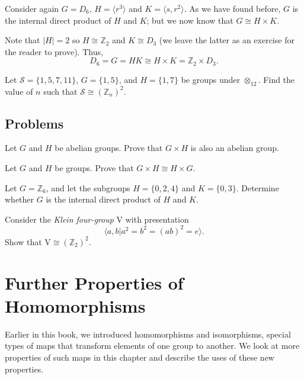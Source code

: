 \begin{example}
    Consider again $G = D_6$, $H = \langle r^3 \rangle$ and $K = \langle s, r^2 \rangle$. As we have found before, $G$ is the internal direct product of $H$ and $K$; but we now know that $G \cong H \times K$.

    Note that $|H| = 2$ so $H \cong \mathbb{Z}_2$ and $K \cong D_3$ (we leave the latter as an exercise for the reader to prove). Thus,
    \[
        D_6 = G = HK \cong H \times K = \mathbb{Z}_2 \times D_3.
    \]
\end{example}

\begin{exercise}
    Let $\mathcal{S} = \{1, 5, 7, 11\}$, $G = \{1, 5\}$, and $H = \{1, 7\}$ be groups under $\otimes_{12}$. Find the value of $n$ such that $\mathcal{S} \cong (\mathbb{Z}_n)^2$.
\end{exercise}

\newpage

\section{Problems}
\begin{problem}\label{problem-external-direct-product-of-abelian-groups-is-abelian}
    Let $G$ and $H$ be abelian groups. Prove that $G \times H$ is also an abelian group.
\end{problem}

\begin{problem}
    Let $G$ and $H$ be groups. Prove that $G \times H \cong H \times G$.
\end{problem}

\begin{problem}
    Let $G = \mathbb{Z}_6$, and let the subgroups $H = \{0, 2, 4\}$ and $K = \{0, 3\}$. Determine whether $G$ is the internal direct product of $H$ and $K$.
\end{problem}

\begin{problem}
    Consider the \textit{Klein four-group} $\mathrm{V}$ with presentation
    \[
        \langle a, b \vert a^2 = b^2 = (ab)^2 = e \rangle.
    \]
    Show that $\mathrm{V} \cong (\mathbb{Z}_2)^2$.
\end{problem}

\chapter{Further Properties of Homomorphisms}
Earlier in this book, we introduced homomorphisms and isomorphisms, special types of maps that transform elements of one group to another. We look at more properties of such maps in this chapter and describe the uses of these new properties.


